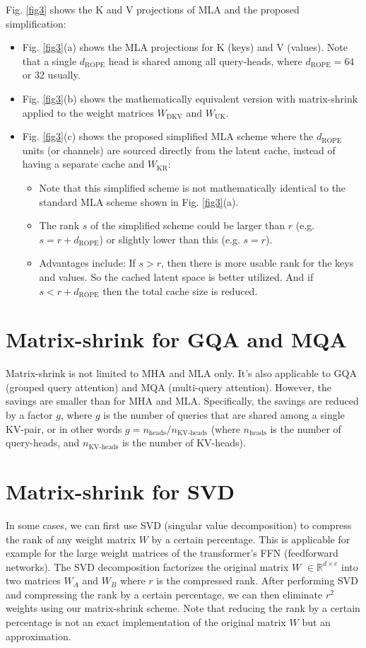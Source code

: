 \documentclass{article}
\newcommand{\WW}[1]{W_\text{#1}}                    %
\newcommand{\eR}[2]{$\in \mathbb{R}^{#1 \times #2}$}  %
\begin{document}
Fig. \ref{fig3} shows the K and V projections of MLA and the proposed simplification:
\begin{itemize}[topsep=-1pt, itemsep=-1pt]
  \item Fig. \ref{fig3}(a) shows the MLA projections for K (keys) and V (values). Note that a single $d_\text{ROPE}$ head is shared among all query-heads, where $d_\text{ROPE} = 64$ or $32$ usually.
  \item Fig. \ref{fig3}(b) shows the mathematically equivalent version with matrix-shrink applied to the weight matrices $\WW{DKV}$ and $\WW{UK}$.
  \item Fig. \ref{fig3}(c) shows the proposed simplified MLA scheme where the $d_\text{ROPE}$ units (or channels) are sourced directly from the latent cache, instead of having a separate cache and $\WW{KR}$:
  \begin{itemize}[topsep=-1pt, itemsep=-1pt]
    \item Note that this simplified scheme is not mathematically identical to the standard MLA scheme shown in Fig. \ref{fig3}(a).
    \item The rank $s$ of the simplified scheme could be larger than $r$ (e.g. $s = r + d_\text{ROPE}$) or slightly lower than this (e.g. $s = r$).
    \item Advantages include: If $s > r$, then there is more usable rank for the keys and values. So the cached latent space is better utilized. And if $s < r + d_\text{ROPE}$ then the total cache size is reduced.
  \end{itemize}
\end{itemize}

\section{Matrix-shrink for GQA and MQA}
Matrix-shrink is not limited to MHA and MLA only. It’s also applicable to GQA (grouped query attention) and MQA (multi-query attention). However, the savings are smaller than for MHA and MLA. Specifically, the savings are reduced by a factor $g$, where $g$ is the number of queries that are shared among a single KV-pair, or in other words $g = n_\text{heads} / n_\text{KV-heads}$ (where $n_\text{heads}$ is the number of query-heads, and $n_\text{KV-heads}$ is the number of KV-heads).

\section{Matrix-shrink for SVD}
In some cases, we can first use SVD (singular value decomposition) to compress the rank of any weight matrix $W$ by a certain percentage. This is applicable for example for the large weight matrices of the transformer’s FFN (feedforward networks). The SVD decomposition factorizes the original matrix $W$ \eR{d}{e} into two matrices $W_A$ and $W_B$ where $r$ is the compressed rank. After performing SVD and compressing the rank by a certain percentage, we can then eliminate $r^2$ weights using our matrix-shrink scheme. Note that reducing the rank by a certain percentage is not an exact implementation of the original matrix $W$ but an approximation.
\end{document}
